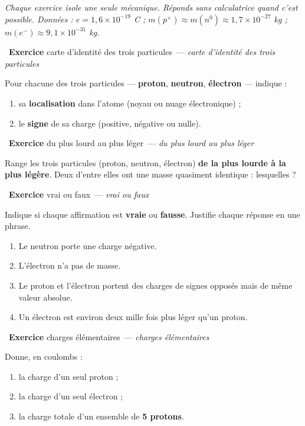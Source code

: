 \documentclass[11pt,a4paper]{article}
\newcommand{\pp}{p^{+}}
\newcommand{\ee}{e^{-}}
\newcommand{\nz}{n^{0}}
\newcounter{exo}
\newcommand{\exo}[1][]{\stepcounter{exo}\par\medskip%
  \noindent{\color{primary}\rule[-2pt]{3.5pt}{15pt}}\ \textbf{\color{primarydark}\large Exercice \theexo}%
  \ifx\relax#1\relax\relax\else\ \textmd{\normalsize\color{black!65}— \itshape #1}\fi\par\nopagebreak\smallskip}
\begin{document}

\vspace{3pt}
{\small\itshape Chaque exercice isole une seule mécanique. Réponds sans calculatrice quand c'est possible.
Données : $e = 1{,}6\times10^{-19}$ C ; $m(\pp)\approx m(\nz)\approx 1{,}7\times10^{-27}$ kg ;
$m(\ee)\approx 9{,}1\times10^{-31}$ kg.}

\exo[carte d'identité des trois particules]
Pour chacune des trois particules — \textbf{proton}, \textbf{neutron}, \textbf{électron} — indique :
\begin{enumerate}[label=\alph*)]
  \item sa \textbf{localisation} dans l'atome (noyau ou nuage électronique) ;
  \item le \textbf{signe} de sa charge (positive, négative ou nulle).
\end{enumerate}

\exo[du plus lourd au plus léger]
Range les trois particules (proton, neutron, électron) \textbf{de la plus lourde à la plus légère}.
Deux d'entre elles ont une masse quasiment identique : lesquelles ?

\exo[vrai ou faux]
Indique si chaque affirmation est \textbf{vraie} ou \textbf{fausse}. Justifie chaque réponse en une phrase.
\begin{enumerate}[label=\alph*)]
  \item Le neutron porte une charge négative.
  \item L'électron n'a pas de masse.
  \item Le proton et l'électron portent des charges de signes opposés mais de même valeur absolue.
  \item Un électron est environ deux mille fois plus léger qu'un proton.
\end{enumerate}

\exo[charges élémentaires]
Donne, en coulombs :
\begin{enumerate}[label=\alph*)]
  \item la charge d'un seul proton ;
  \item la charge d'un seul électron ;
  \item la charge totale d'un ensemble de \textbf{5 protons}.
\end{enumerate}
\end{document}
